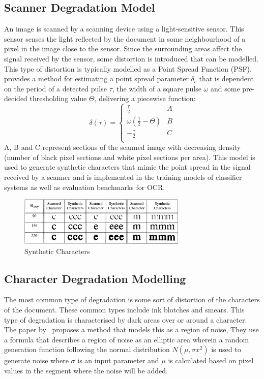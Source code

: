 \documentclass[a4paper, 12pt]{report}
\begin{document}
\subsection{Scanner Degradation Model}

An image is scanned by a scanning device using a light-sensitive sensor. This sensor senses the light reflected by the document in some neighbourhood of a pixel in the image close to the sensor. Since the surrounding areas affect the signal received by the sensor, some distortion is introduced that can be modelled. This type of distortion is typically modelled as a Point Spread Function (PSF).~\cite{smith1998characterization} provides a method for estimating a point spread parameter \(\delta_c\) that is dependent on the period of a detected pulse \(\tau\), the width of a square pulse \(\omega\) and some pre-decided thresholding value \(\Theta\), delivering a piecewise function:
\[
    \delta(\tau)=
    \begin{cases}
        \frac{\tau}{2}             & A \\
        \omega(\frac{1}{2}-\Theta) & B \\
        -\frac{\tau}{2}            & C \\
    \end{cases}
\]
A, B and C represent sections of the scanned image with decreasing density (number of black pixel sections and white pixel sections per area). This model is used to generate synthetic characters that mimic the point spread in the signal received by a scanner and is implemented in the training models of classifier systems as well as evaluation benchmarks for OCR.

\begin{figure}[ht]
    \centering
    \includegraphics[width=8cm]{scanner.jpg}
    \caption{Synthetic Characters~\cite{smith1998characterization}}
    \label{fig:scanner}
\end{figure}

\subsection{Character Degradation Modelling}
The most common type of degradation is some sort of distortion of the characters of the document. These common types include ink blotches and smears. This type of degradation is characterised by dark areas over or around a character. The paper by~\cite{kieu2012character} proposes a method that models this as a region of noise, They use a formula that describes a region of noise as an elliptic area wherein a random generation function following the normal distribution \(N(\mu,\sigma x^2)\) is used to generate noise where \(\sigma\) is an input parameter and \(\mu\) is calculated based on pixel values in the segment where the noise will be added.
\end{document}

